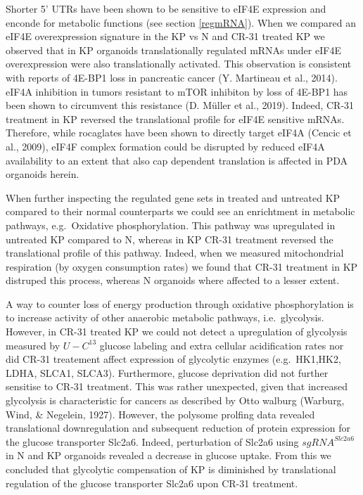\documentclass[12pt,openany]{book}
\begin{document}
Shorter 5' UTRs have been shown to be sensitive to eIF4E expression and
enconde for metabolic functions (see section \ref{regmRNA}). When we
compared an eIF4E overexpression signature in the KP vs N and CR-31
treated KP we observed that in KP organoids translationally regulated
mRNAs under eIF4E overexpression were also translationally activated.
This observation is consistent with reports of 4E-BP1 loss in pancreatic
cancer (Y. Martineau et al., 2014). eIF4A inhibition in tumors resistant
to mTOR inhibiton by loss of 4E-BP1 has been shown to circumvent this
resistance (D. Müller et al., 2019). Indeed, CR-31 treatment in KP
reversed the translational profile for eIF4E sensitive mRNAs. Therefore,
while rocaglates have been shown to directly target eIF4A (Cencic et
al., 2009), eIF4F complex formation could be disrupted by reduced eIF4A
availability to an extent that also cap dependent translation is
affected in PDA organoids herein.

When further inspecting the regulated gene sets in treated and untreated
KP compared to their normal counterparts we could see an enrichtment in
metabolic pathways, e.g.~Oxidative phosphorylation. This pathway was
upregulated in untreated KP compared to N, whereas in KP CR-31 treatment
reversed the translational profile of this pathway. Indeed, when we
measured mitochondrial respiration (by oxygen consumption rates) we
found that CR-31 treatment in KP distruped this process, whereas N
organoids where affected to a lesser extent.

A way to counter loss of energy production through oxidative
phosphorylation is to increase activity of other anaerobic metabolic
pathways, i.e.~glycolysis. However, in CR-31 treated KP we could not
detect a upregulation of glycolysis measured by \(U-C^{13}\) glucose
labeling and extra cellular acidification rates nor did CR-31 treatement
affect expression of glycolytic enzymes (e.g.~HK1,HK2, LDHA, SLCA1,
SLCA3). Furthermore, glucose deprivation did not further sensitise to
CR-31 treatment. This was rather unexpected, given that increased
glycolysis is characteristic for cancers as described by Otto walburg
(Warburg, Wind, \& Negelein, 1927). However, the polysome prolfing data
revealed translational downregulation and subsequent reduction of
protein expression for the glucose transporter Slc2a6. Indeed,
perturbation of Slc2a6 using \(sgRNA^{Slc2a6}\) in N and KP organoids
revealed a decrease in glucose uptake. From this we concluded that
glycolytic compensation of KP is diminished by translational regulation
of the glucose transporter Slc2a6 upon CR-31 treatment.
\end{document}
